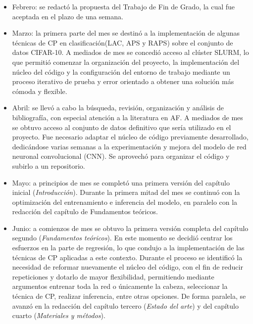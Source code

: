 \begin{itemize}

    \item Febrero: se redactó la propuesta del Trabajo de Fin de Grado, la cual fue aceptada en el plazo de una semana.
    
    \item Marzo: la primera parte del mes se destinó a la implementación de algunas técnicas de CP en clasificación(LAC, APS y RAPS) sobre el conjunto de datos CIFAR-10. A mediados de mes se concedió acceso al clúster SLURM, lo que permitió comenzar la organización del proyecto, la implementación del núcleo del código y la configuración del entorno de trabajo mediante un proceso iterativo de prueba y error orientado a obtener una solución más cómoda y flexible.
    
    \item Abril: se llevó a cabo la búsqueda, revisión, organización y análisis de bibliografía, con especial atención a la literatura en AF. A mediados de mes se obtuvo acceso al conjunto de datos definitivo que sería utilizado en el proyecto. Fue necesario adaptar el núcleo de código previamente desarrollado, dedicándose varias semanas a la experimentación y mejora del modelo de red neuronal convolucional (CNN). Se aprovechó para organizar el código y subirlo a un repositorio. 

    \item Mayo: a principios de mes se completó una primera versión del capítulo inicial (\textit{Introducción}). Durante la primera mitad del mes se continuó con la optimización del entrenamiento e inferencia del modelo, en paralelo con la redacción del capítulo de Fundamentos teóricos.

    \item Junio: a comienzos de mes se obtuvo la primera versión completa del capítulo segundo (\textit{Fundamentos teóricos}). En este momento se decidió centrar los esfuerzos en la parte de regresión, lo que condujo a la implementación de las técnicas de CP aplicadas a este contexto. Durante el proceso se identificó la necesidad de reformar nuevamente el núcleo del código, con el fin de reducir repeticiones y dotarlo de mayor flexibilidad, permitiendo mediante argumentos entrenar toda la red o únicamente la cabeza, seleccionar la técnica de CP, realizar inferencia, entre otras opciones. De forma paralela, se avanzó en la redacción del capítulo tercero (\textit{Estado del arte}) y del capítulo cuarto (\textit{Materiales y métodos}).


\end{itemize}
